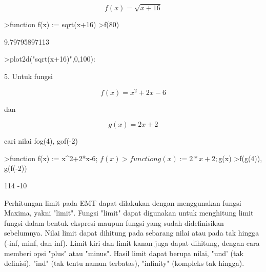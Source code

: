 \documentclass[12pt,Times new roman,letterpaper]{book}
\begin{document}
\begin{eulernootebook}
\begin{eulercomment}
\begin{eulercomment}
\begin{eulernootebook}
\begin{eulercomment}
\begin{eulercomment}
\begin{eulercomment}
\begin{eulercomment}
\begin{eulercomment}
\begin{eulercomment}
\begin{eulernotebook}
\begin{eulercomment}
\begin{eulercomment}
\begin{eulercomment}
\begin{eulercomment}
\begin{eulercomment}
\end{eulercomment}
\begin{eulerformula}
\[
f(x)=\sqrt{x+16}
\]
\end{eulerformula}
\begin{eulerprompt}
>function f(x) := sqrt(x+16)
>f(80)
\end{eulerprompt}
\begin{euleroutput}
  9.79795897113
\end{euleroutput}
\begin{eulerprompt}
>plot2d("sqrt(x+16)",0,100):
\end{eulerprompt}
\begin{eulercomment}
5. Untuk fungsi

\end{eulercomment}
\begin{eulerformula}
\[
f(x)=x^2+2x-6
\]
\end{eulerformula}
\begin{eulercomment}
dan\\
\end{eulercomment}
\begin{eulerformula}
\[
g(x)=2x+2
\]
\end{eulerformula}
\begin{eulercomment}
cari nilai fog(4), gof(-2)
\end{eulercomment}
\begin{eulerprompt}
>function f(x) := x^2+2*x-6; $f(x)
>function g(x) := 2*x+2; $g(x)
>f(g(4)), g(f(-2))
\end{eulerprompt}
\begin{euleroutput}
  114
  -10
\end{euleroutput}
\begin{eulercomment}
Perhitungan limit pada EMT dapat dilakukan dengan menggunakan fungsi
Maxima, yakni "limit". Fungsi "limit" dapat digunakan untuk menghitung
limit fungsi dalam bentuk ekspresi maupun fungsi yang sudah
didefinisikan sebelumnya. Nilai limit dapat dihitung pada sebarang
nilai atau pada tak hingga (-inf, minf, dan inf). Limit kiri dan limit
kanan juga dapat dihitung, dengan cara memberi opsi "plus" atau
"minus". Hasil limit dapat berupa nilai, "und’ (tak definisi), "ind"
(tak tentu namun terbatas), "infinity" (kompleks tak hingga).


\end{eulercomment}
\end{eulercomment}
\end{eulercomment}
\end{eulercomment}
\end{eulercomment}
\end{eulernotebook}
\end{eulercomment}
\end{eulercomment}
\end{eulercomment}
\end{eulercomment}
\end{eulercomment}
\end{eulercomment}
\end{eulernootebook}
\end{eulercomment}
\end{eulercomment}
\end{eulernootebook}
\end{document}
